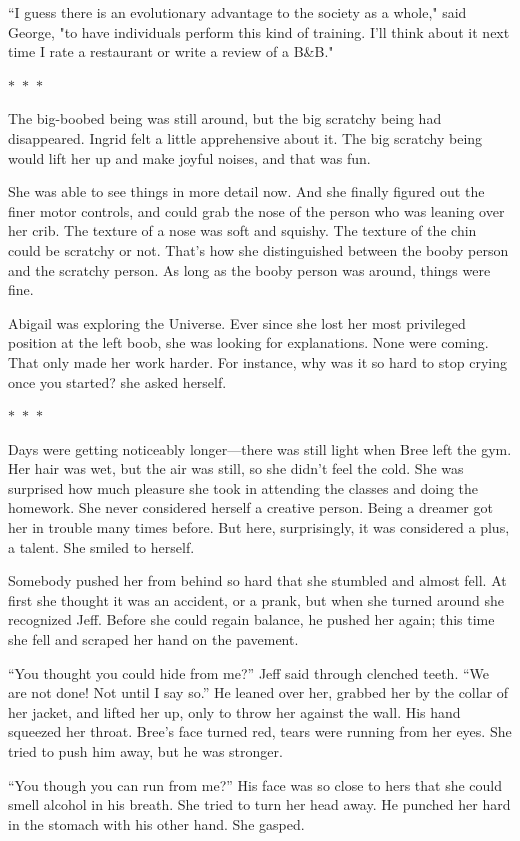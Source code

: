\documentclass{memoir}
\newcommand{\starbreak}{%
\begin{center}
  $\ast$~$\ast$~$\ast$
\end{center}
}
\begin{document}
``I guess there is an evolutionary advantage to the society as a whole," said George, "to have individuals perform this kind of training. I'll think about it next time I rate a restaurant or write a review of a B\&B."


\starbreak

The big-boobed being was still around, but the big scratchy being had disappeared. Ingrid felt a little apprehensive about it. The big scratchy being would lift her up and make joyful noises, and that was fun. 

She was able to see things in more detail now. And she finally figured out the finer motor controls, and could grab the nose of the person who was leaning over her crib. The texture of a nose was soft and squishy. The texture of the chin could be scratchy or not. That's how she distinguished between the booby person and the scratchy person. As long as the booby person was around, things were fine.

Abigail was exploring the Universe. Ever since she lost her most privileged position at the left boob, she was looking for explanations. None were coming. That only made her work harder. For instance, why was it so hard to stop crying once you started? she asked herself.

\starbreak

Days were getting noticeably longer---there was still light when Bree left the gym. Her hair was wet, but the air was still, so she didn't feel the cold. She was surprised how much pleasure she took in attending the classes and doing the homework. She never considered herself a creative person. Being a dreamer got her in trouble many times before. But here, surprisingly, it was considered a plus, a talent. She smiled to herself.
 
Somebody pushed her from behind so hard that she stumbled and almost fell. At first she thought it was an accident, or a prank, but when she turned around she recognized Jeff. Before she could regain balance, he pushed her again; this time she fell and scraped her hand on the pavement. 

``You thought you could hide from me?'' Jeff said through clenched teeth. ``We are not done! Not until I say so.'' He leaned over her, grabbed her by the collar of her jacket, and lifted her up, only to throw her against the wall. His hand squeezed her throat. Bree's face turned red, tears were running from her eyes. She tried to push him away, but he was stronger. 

``You though you can run from me?'' His face was so close to hers that she could smell alcohol in his breath. She tried to turn her head away. He punched her hard in the stomach with his other hand. She gasped. 
\end{document}
